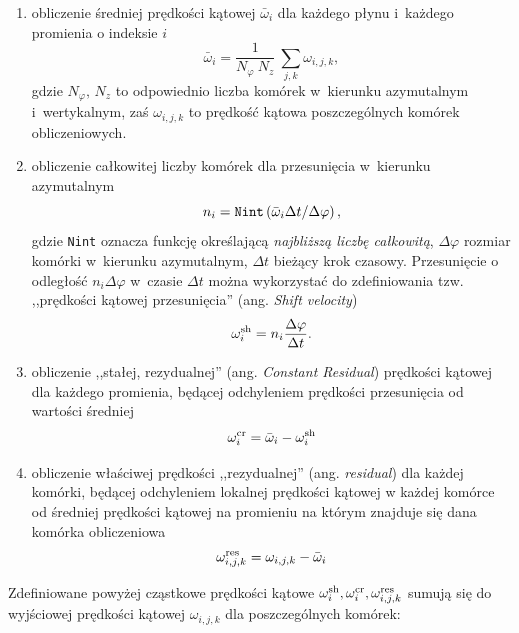 \begin{enumerate}
   \item obliczenie średniej prędkości kątowej $\bar{\omega}_i$ dla każdego
      płynu i~każdego promienia o indeksie $i$
      \begin{equation}
         \bar{\omega}_i = \frac{1}{N_\varphi~N_z} ~ \sum_{j,k} \omega_{i,j,k},
      \end{equation}
      gdzie $N_\varphi,\,N_z$ to odpowiednio liczba komórek w~kierunku
      azymutalnym i~wertykalnym, zaś $\omega_{i,j,k}$ to prędkość kątowa
      poszczególnych komórek obliczeniowych.
   \item  obliczenie całkowitej liczby komórek dla przesunięcia w~kierunku
      azymutalnym
      \begin{equation}
         n_i = {\tt Nint} \left( \bar{\omega}_i \Delta t/\Delta \varphi \right),
      \end{equation}
      gdzie {\tt Nint} oznacza funkcję określającą \emph{najbliższą liczbę
      całkowitą}, $\Delta\varphi$ rozmiar komórki w~kierunku azymutalnym,
      $\Delta t$ bieżący krok czasowy. Przesunięcie o odległość $n_i \Delta
      \varphi$ w~czasie $\Delta t$ można wykorzystać do
      zdefiniowania tzw. ,,prędkości kątowej przesunięcia'' (ang. \emph{Shift
      velocity})
      \begin{equation}
         \omega_i^{\rm sh} = n_i \frac{\Delta \varphi}{\Delta t}.
      \end{equation}
   \item obliczenie ,,stałej, rezydualnej'' (ang. \emph{Constant Residual})
      prędkości kątowej  dla każdego promienia, będącej odchyleniem prędkości
      przesunięcia od wartości średniej
      \begin{equation}
         \omega_i^{\rm cr}= \bar{\omega}_i - \omega_i^{\rm sh}
      \end{equation}
   \item obliczenie właściwej prędkości ,,rezydualnej'' (ang. \emph{residual})
      dla każdej komórki, będącej odchyleniem lokalnej prędkości kątowej w
      każdej komórce od średniej prędkości kątowej na promieniu na którym
      znajduje się dana komórka obliczeniowa 
      \begin{equation}
         \omega_{i,j,k}^{\rm res} = \omega_{i,j,k} - \bar{\omega}_i
      \end{equation}
\end{enumerate}

Zdefiniowane powyżej cząstkowe prędkości kątowe $\omega_i^{\rm sh},
\omega_i^{\rm cr}, \omega_{i,j,k}^{\rm res}$ sumują się do wyjściowej prędkości
kątowej $\omega_{i,j,k}$ dla poszczególnych komórek:

